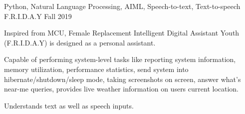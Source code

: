 \begin{cventries}

  \cventry
    {Python, Natural Language Processing, AIML, Speech-to-text, Text-to-speech} %
    {F.R.I.D.A.Y} %
    {} %
    {Fall 2019} %
    {
      \begin{cvitems} %
        \item {Inspired from MCU, Female Replacement Intelligent Digital Assistant Youth (F.R.I.D.A.Y) is designed as a personal assistant.}
        \item {Capable of performing system-level tasks like reporting system information, memory utilization, performance statistics, send system into hibernate/shutdown/sleep mode, taking screenshots on screen, answer what's near-me queries, provides live weather information on users current location.}
        \item {Understands text as well as speech inputs.}
      \end{cvitems}
    }

\end{cventries}

